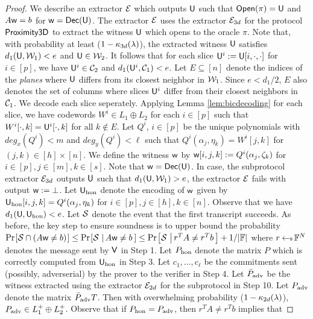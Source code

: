 \begin{proof}
We describe an extractor $\mathcal{E}$ which outputs $\mathsf{U}$ such that $\mathsf{Open}(\pi)=\mathsf{U}$ and $A\mathsf{w} = b$ 
for $\mathsf{w}=\mathsf{Dec}(\mathsf{U})$. The extractor $\mathcal{E}$ uses the extractor $\mathcal{E}_{3d}$ for
the protocol $\mathsf{Proximity3D}$ to extract the witness $\mathsf{U}$ which opens to
the oracle $\pi$. Note that, with probability at least ($1-\kappa_{3d}(\lambda)$),
the extracted witness $\mathsf{U}$ satisfies $d_1(\mathsf{U},\mathcal{W}_1)<e$ and $\mathsf{U}\in
\mathcal{W}_2$. It follows that for each slice $\mathsf{U}^i:=\mathsf{U}[i,\cdot,\cdot]$ for $i\in [p]$,
we have $\mathsf{U}^i\in \mathcal{C}_2$ and $d_1(\mathsf{U}^i,\mathcal{C}_1)<e$. Let $E\subseteq
[n]$ denote the indices of the {\em planes} where $\mathsf{U}$ differs from its closest
neighbor in $\mathcal{W}_1$. Since $e<d_1/2$, $E$ also denotes the set of columns
where slices $\mathsf{U}^i$ differ from their closest neighbors in $\mathcal{C}_1$. We
decode each slice seperately. Applying Lemma \ref{lem:bicdecoding} for each
slice, we have codewords $W^i\in L_1\oplus L_2$ for each $i\in [p]$ such that
$W^i[\cdot,k]=\mathsf{U}^i[\cdot,k]$ for all $k\not\in E$. Let $Q^i$, $i\in [p]$ be
the unique polynomials with $deg_x(Q^i)<m$ and $deg_y(Q^i)<\ell$ such that
$Q^i(\alpha_j,\eta_k)=W^i[j,k]$ for $(j,k)\in [h]\times [n]$. We define the
witness $\mathsf{w}$ by $\mathsf{w}[i,j,k] := Q^i(\alpha_j,\zeta_k)$ for $i\in [p],j\in
[m],k\in [s]$. Note that $\mathsf{w}=\mathsf{Dec}(\mathsf{U})$. In case, the subprotocol extractor
$\mathcal{E}_{3d}$ outputs $\mathsf{U}$ such that $d_1(\mathsf{U},\mathcal{W}_1)>e$, the extractor
$\mathcal{E}$ fails with output $\mathsf{w} := \bot$. Let $\mathsf{U}_{\rm hon}$ denote the
encoding of $\mathsf{w}$ given by $\mathsf{U}_{\rm hon}[i,j,k]=Q^i(\alpha_j,\eta_k)$ for
$i\in [p],j\in [h], k\in [n]$. Observe that we have $d_1(\mathsf{U},\mathsf{U}_{\rm
hon})<e$. Let $\mathcal{S}$ denote the event that the
first transcript succeeds. As before, the key step to ensure soundness is to
upper bound the probability $\prob{\mc{S}\cap (A\wit\neq b)}\leq
\condprob{\mc{S}}{A\wit\neq b}\leq \condprob{\mc{S}}{r^TA\neq r^Tb}+1/|\FF|$
where $r\hskip2.3pt{\gets\!\!\mbox{\tiny${\$}$\normalsize}}\, \mathbb{F}^N$ denotes the message sent by $\mathsf{V}$ in Step 1. Let
$P_{\rm hon}$ denote the matrix $P$ which is correctly computed from $\mathsf{U}_{\rm
hon}$ in
Step 3. Let $c_1,\ldots,c_{\ell}$ be the commitments sent (possibly,
adverserial) by the prover to the verifier in Step 4. Let $\bar{P}_{\rm adv}$ be the
witness extracted using the extractor $\mathcal{E}_{2d}$ for the subprotocol in Step
10. Let $P_{\rm adv}$ denote the matrix $\bar{P}_{\rm adv}T$. Then with overwhelming
probability ($1-\kappa_{2d}(\lambda)$), $P_{\rm adv}\in L^{+}_1\oplus L^{+}_2$. Observe
that if $P_{\rm hon}=P_{\rm adv}$, then $r^TA\neq r^Tb$ implies that

\end{proof}
